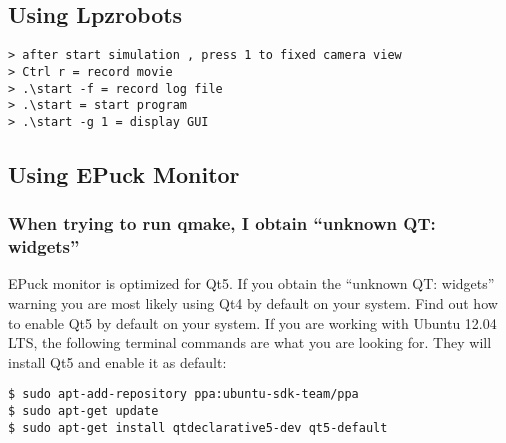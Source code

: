 \subsection{Using Lpzrobots}
\begin{lstlisting}
> after start simulation , press 1 to fixed camera view
> Ctrl r = record movie
> .\start -f = record log file
> .\start = start program
> .\start -g 1 = display GUI
\end{lstlisting} 

\subsection{Using EPuck Monitor}

\subsubsection{When trying to run qmake, I obtain ``unknown QT: widgets''}
EPuck monitor is optimized for Qt5. If you obtain the ``unknown QT: widgets'' warning you are most likely using Qt4 by default on your system. Find out how to enable Qt5 by default on your system. If you are working with Ubuntu 12.04 LTS, the following terminal commands are what you are looking for. They will install Qt5 and enable it as default:
\begin{lstlisting}
$ sudo apt-add-repository ppa:ubuntu-sdk-team/ppa
$ sudo apt-get update
$ sudo apt-get install qtdeclarative5-dev qt5-default
\end{lstlisting}


